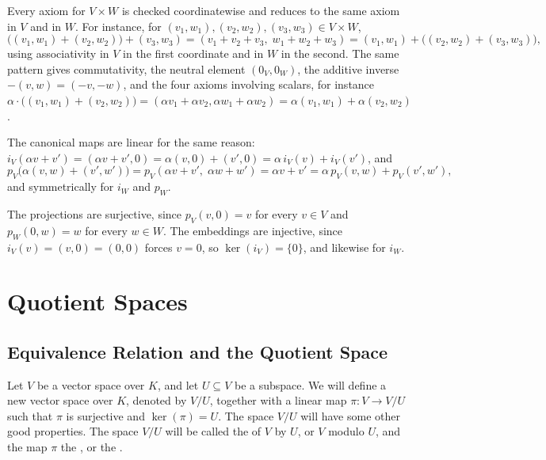 \begin{exercisesolution}
\label{sol:direct_sum_axioms}
Every axiom for $V \times W$ is checked coordinatewise and reduces to the same axiom in $V$ and in $W$. For instance, for $(v_1,w_1), (v_2,w_2), (v_3,w_3) \in V \times W$,
\[
\big((v_1,w_1) + (v_2,w_2)\big) + (v_3,w_3) = (v_1 + v_2 + v_3, \; w_1 + w_2 + w_3) = (v_1,w_1) + \big((v_2,w_2) + (v_3,w_3)\big),
\]
using associativity in $V$ in the first coordinate and in $W$ in the second. The same pattern gives commutativity, the neutral element $(0_V, 0_W)$, the additive inverse $-(v,w) = (-v,-w)$, and the four axioms involving scalars, for instance $\alpha \cdot \big((v_1,w_1) + (v_2,w_2)\big) = (\alpha v_1 + \alpha v_2, \alpha w_1 + \alpha w_2) = \alpha (v_1,w_1) + \alpha (v_2,w_2)$.

The canonical maps are linear for the same reason: $i_V(\alpha v + v') = (\alpha v + v', 0) = \alpha (v,0) + (v',0) = \alpha \, i_V(v) + i_V(v')$, and
\[
p_V\big(\alpha (v,w) + (v',w')\big) = p_V(\alpha v + v', \; \alpha w + w') = \alpha v + v' = \alpha \, p_V(v,w) + p_V(v',w'),
\]
and symmetrically for $i_W$ and $p_W$.

The projections are surjective, since $p_V(v, 0) = v$ for every $v \in V$ and $p_W(0,w) = w$ for every $w \in W$. The embeddings are injective, since $i_V(v) = (v,0) = (0,0)$ forces $v = 0$, so $\ker(i_V) = \{0\}$, and likewise for $i_W$.
\end{exercisesolution}


\setcounter{section}{2}
\renewcommand{\thetheorem}{18.c.\arabic{theorem}}
\setcounter{theorem}{0}
\section{Quotient Spaces}

\subsection{Equivalence Relation and the Quotient Space}

Let $V$ be a vector space over $K$, and let $U \subseteq V$ be a subspace. We will define a new vector space over $K$, denoted by $V/U$, together with a linear map $\pi \colon V \to V/U$ such that $\pi$ is surjective and $\ker(\pi) = U$. The space $V/U$ will have some other good properties. The space $V/U$ will be called the  of $V$ by $U$, or $V$ modulo $U$, and the map $\pi$ the , or the .

